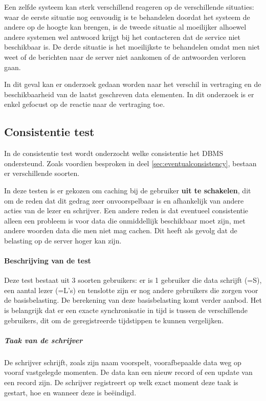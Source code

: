 Een zelfde systeem kan sterk verschillend reageren op de verschillende situaties: waar de eerste situatie nog eenvoudig is te behandelen doordat het systeem de andere op de hoogte kan brengen, is de tweede situatie al moeilijker alhoewel andere systemen wel antwoord krijgt bij het contacteren dat de service niet beschikbaar is. De derde situatie is het moeilijkste te behandelen omdat men niet weet of de berichten naar de server niet aankomen of de antwoorden verloren gaan. 

In dit geval kan er onderzoek gedaan worden naar het verschil in vertraging en de beschikbaarheid van de laatst geschreven data elementen. In dit onderzoek is er enkel gefocust op de reactie naar de vertraging toe. 
 
\subsection{Consistentie test}
In de consistentie test wordt onderzocht welke consistentie het DBMS ondersteund. Zoals voordien besproken in deel \ref{sec:eventualconsistency}, bestaan er verschillende soorten. 

In deze testen is er gekozen om caching bij de gebruiker \textbf{uit te schakelen}, dit om de reden dat dit gedrag zeer onvoorspelbaar is en afhankelijk van andere acties van de lezer en schrijver. Een andere reden is dat eventueel consistentie alleen een probleem is voor data die onmiddellijk beschikbaar moet zijn, met andere woorden data die men niet mag cachen. Dit heeft als gevolg dat de belasting op de server hoger kan zijn. 

\paragraph{Beschrijving van de test} Deze test bestaat uit 3 soorten gebruikers: er is 1 gebruiker die data schrijft (=S), een aantal lezer (=L's) en tenslotte zijn er nog andere gebruikers die zorgen voor de basisbelasting. De berekening van deze basisbelasting komt verder aanbod.  
Het is belangrijk dat er een exacte synchronisatie in tijd is tussen de verschillende gebruikers, dit om de geregistreerde tijdstippen te kunnen vergelijken.


\subparagraph{Taak van de schrijver} De schrijver schrijft, zoals zijn naam voorspelt, voorafbepaalde data weg op vooraf vastgelegde momenten. De data kan een nieuw record of een update van een record zijn. De schrijver registreert op welk exact moment deze taak is gestart, hoe en wanneer deze is beëindigd.

